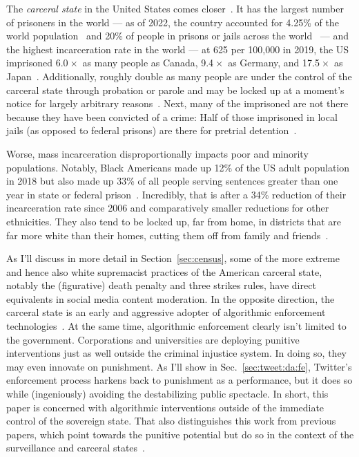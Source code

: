 The \emph{carceral state} in the United States comes closer~\cite{Simon2007}. It
has the largest number of prisoners in the world — as of 2022, the country
accounted for 4.25\% of the world population~\cite{Worldometer2023} and 20\% of
people in prisons or jails across the world~\cite{SawyerWagner2022} — and the
highest incarceration rate in the world — at 625 per 100,000 in 2019, the US
imprisoned 6.0$\mspace{1mu}\times$ as many people as Canada,
9.4$\mspace{1mu}\times$ as Germany, and 17.5$\mspace{1mu}\times$ as
Japan~\cite{WorldPrisonBrief2023}. Additionally, roughly double as many people
are under the control of the carceral state through probation or parole and may
be locked up at a moment's notice for largely arbitrary
reasons~\cite{SawyerWagner2022}. Next, many of the imprisoned are not there
because they have been convicted of a crime: Half of those imprisoned in local
jails (as opposed to federal prisons) are there for pretrial
detention~\cite{SawyerWagner2022}.

Worse, mass incarceration disproportionally impacts poor and minority
populations. Notably, Black Americans made up 12\% of the US adult population in
2018 but also made up 33\% of all people serving sentences greater than one year
in state or federal prison~\cite{Gramlich2020}. Incredibly, that is after a 34\%
reduction of their incarceration rate since 2006 and comparatively smaller
reductions for other ethnicities. They also tend to be locked up, far from home,
in districts that are far more white than their homes, cutting them off from
family and friends~\cite{WagnerKopf2015}.

As I'll discuss in more detail in Section~\ref{sec:census}, some of the more
extreme and hence also white supremacist practices of the American carceral
state, notably the (figurative) death penalty and three strikes rules, have
direct equivalents in social media content moderation. In the opposite
direction, the carceral state is an early and aggressive adopter of algorithmic
enforcement
technologies~\cite{AngwinLarsonea2016,EPIC2020,Hao2019,ReddenODonovanDixea2020,Yampolskiy2016}.
At the same time, algorithmic enforcement clearly isn't limited to the
government. Corporations and universities are deploying punitive interventions
just as well outside the criminal injustice system. In doing so, they may even
innovate on punishment. As I'll show in Sec.~\ref{sec:tweet:da:fe}, Twitter's
enforcement process harkens back to punishment as a performance, but it does so
while (ingeniously) avoiding the destabilizing public spectacle. In short, this
paper is concerned with algorithmic interventions outside of the immediate
control of the sovereign state. That also distinguishes this work from previous
papers, which point towards the punitive potential but do so in the context of
the surveillance and carceral
states~\cite{DehlendorfGerety2021,McElroyWhittakerea2021}.

